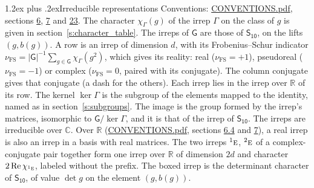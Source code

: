 \documentclass[10pt,a4paper]{article}
\makeatletter
\renewcommand\section{\@startsection{section}{1}{\z@}{-3ex plus -1ex minus -.2ex}%
  {1.2ex plus .2ex}{\normalfont\large\sffamily\bfseries\color{parttitle}}}
\numberwithin{equation}{section}
\newcommand{\grp}[1]{\mathsf{#1}}
\newcommand{\irr}[1]{\text{\normalfont\scshape #1}}
\newcommand{\conjpair}[1]{{}^{#1}}
\newcommand{\irchar}[1]{\chi_{#1}}
\newcommand{\fsind}{\nu_{\mathrm{FS}}}
\makeatother
\begin{document}
\section{Irreducible representations}\label{s:irreps}
Conventions: \href{../../CONVENTIONS.pdf}{CONVENTIONS.pdf}, sections \href{../../../rotation/CONVENTIONS.pdf\#conv.6}{6}, \href{../../../rotation/CONVENTIONS.pdf\#conv.7}{7} and \href{../../CONVENTIONS.pdf\#conv.23}{23}.
\leavevmode\label{n:function.character}\label{n:irrep.Gamma}The character $\irchar{\Gamma}(g)$ of the irrep $\Gamma$ on the class of $g$ is given in section~\ref{s:character_table}. The irreps of $\grp{G}$ are those of \href{../../../rotation/data/pdf/S10.pdf}{$\grp{S_{10}}$}, on the lifts $(g, b(g))$.
\leavevmode\label{n:index.dimension}\label{n:index.frobenius}\label{n:head.irrep}\label{n:head.reality}A row is an irrep of dimension $d$, with its Frobenius--Schur indicator $\fsind = |\grp{G}|^{-1}\allowbreak\sum_{g\in\grp{G}}\irchar{\Gamma}(g^2)$, which gives its reality: real ($\fsind = +1$), pseudoreal ($\fsind = -1$) or complex ($\fsind = 0$, paired with its conjugate). \label{n:head.conjugate}The column conjugate gives that conjugate (a dash for the others). \label{n:head.over.real}Each irrep lies in the irrep over $\mathbb{R}$ of its row. \label{n:head.kernel}The kernel $\ker\Gamma$ is the subgroup of the elements mapped to the identity, named as in section~\ref{s:subgroups}. \label{n:head.image}The image is the group formed by the irrep's matrices, isomorphic to $\grp{G}/\ker\Gamma$, and it is that of the irrep of \href{../../../rotation/data/pdf/S10.pdf}{$\grp{S_{10}}$}. The irreps are irreducible over $\mathbb{C}$. Over $\mathbb{R}$ (\href{../../CONVENTIONS.pdf}{CONVENTIONS.pdf}, sections \href{../../../rotation/CONVENTIONS.pdf\#conv.6.4}{6.4} and \href{../../../rotation/CONVENTIONS.pdf\#conv.7}{7}), a real irrep is also an irrep in a basis with real matrices. The two irreps $\conjpair{1}\irr{e}$, $\conjpair{2}\irr{e}$ of a complex-conjugate pair together form one irrep over $\mathbb{R}$ of dimension $2d$ and character $2\operatorname{Re}\irchar{\conjpair{1}\irr{e}}$, labeled without the prefix. \label{n:mark.determinant}The boxed irrep is the determinant character of \href{../../../rotation/data/pdf/S10.pdf}{$\grp{S_{10}}$}, of value $\det g$ on the element $(g, b(g))$.
\setlength{\emergencystretch}{2em}\par\setlength{\emergencystretch}{0pt}
\end{document}
